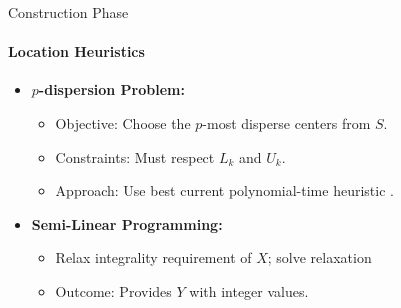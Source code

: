 \documentclass{beamer}
\begin{document}
\begin{frame}{Construction Phase}
    \framesubtitle{Location Heuristics}
    \begin{itemize}
        \item \textbf{$p$-dispersion Problem:}
        \begin{itemize}
            \item Objective: Choose the $p$-most disperse centers from $S$.
            \item Constraints: Must respect $L_k$ and $U_k$.
            \item Approach: Use best current polynomial-time heuristic \cite{ravi_heuristic_1994}.
        \end{itemize}
        
        \item \textbf{Semi-Linear Programming:}
        \begin{itemize}
            \item Relax integrality requirement of $X$; solve relaxation
            \item Outcome: Provides $Y$ with integer values.
        \end{itemize}
    \end{itemize}

\end{frame}
\end{document}
